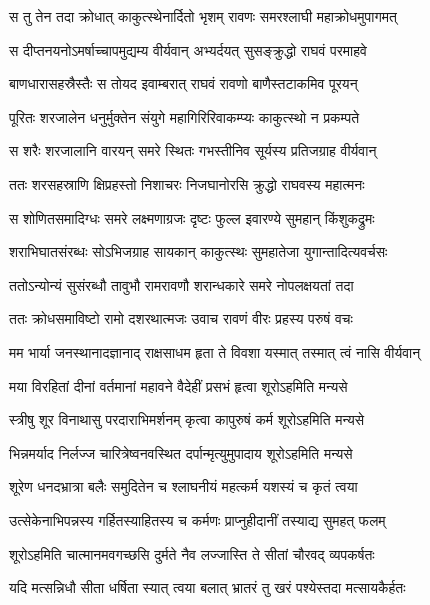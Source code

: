 
\twolineshloka
{स तु तेन तदा क्रोधात् काकुत्स्थेनार्दितो भृशम्}
{रावणः समरश्लाघी महाक्रोधमुपागमत्} %

\twolineshloka
{स दीप्तनयनोऽमर्षाच्चापमुद्यम्य वीर्यवान्}
{अभ्यर्दयत् सुसङ्क्रुद्धो राघवं परमाहवे} %

\twolineshloka
{बाणधारासहस्रैस्तैः स तोयद इवाम्बरात्}
{राघवं रावणो बाणैस्तटाकमिव पूरयन्} %

\twolineshloka
{पूरितः शरजालेन धनुर्मुक्तेन संयुगे}
{महागिरिरिवाकम्प्यः काकुत्स्थो न प्रकम्पते} %

\twolineshloka
{स शरैः शरजालानि वारयन् समरे स्थितः}
{गभस्तीनिव सूर्यस्य प्रतिजग्राह वीर्यवान्} %

\twolineshloka
{ततः शरसहस्राणि क्षिप्रहस्तो निशाचरः}
{निजघानोरसि क्रुद्धो राघवस्य महात्मनः} %

\twolineshloka
{स शोणितसमादिग्धः समरे लक्ष्मणाग्रजः}
{दृष्टः फुल्ल इवारण्ये सुमहान् किंशुकद्रुमः} %

\twolineshloka
{शराभिघातसंरब्धः सोऽभिजग्राह सायकान्}
{काकुत्स्थः सुमहातेजा युगान्तादित्यवर्चसः} %

\twolineshloka
{ततोऽन्योन्यं सुसंरब्धौ तावुभौ रामरावणौ}
{शरान्धकारे समरे नोपलक्षयतां तदा} %

\twolineshloka
{ततः क्रोधसमाविष्टो रामो दशरथात्मजः}
{उवाच रावणं वीरः प्रहस्य परुषं वचः} %

\twolineshloka
{मम भार्या जनस्थानादज्ञानाद् राक्षसाधम}
{हृता ते विवशा यस्मात् तस्मात् त्वं नासि वीर्यवान्} %

\twolineshloka
{मया विरहितां दीनां वर्तमानां महावने}
{वैदेहीं प्रसभं हृत्वा शूरोऽहमिति मन्यसे} %

\twolineshloka
{स्त्रीषु शूर विनाथासु परदाराभिमर्शनम्}
{कृत्वा कापुरुषं कर्म शूरोऽहमिति मन्यसे} %

\twolineshloka
{भिन्नमर्याद निर्लज्ज चारित्रेष्वनवस्थित}
{दर्पान्मृत्युमुपादाय शूरोऽहमिति मन्यसे} %

\twolineshloka
{शूरेण धनदभ्रात्रा बलैः समुदितेन च}
{श्लाघनीयं महत्कर्म यशस्यं च कृतं त्वया} %

\twolineshloka
{उत्सेकेनाभिपन्नस्य गर्हितस्याहितस्य च}
{कर्मणः प्राप्नुहीदानीं तस्याद्य सुमहत् फलम्} %

\twolineshloka
{शूरोऽहमिति चात्मानमवगच्छसि दुर्मते}
{नैव लज्जास्ति ते सीतां चौरवद् व्यपकर्षतः} %

\twolineshloka
{यदि मत्सन्निधौ सीता धर्षिता स्यात् त्वया बलात्}
{भ्रातरं तु खरं पश्येस्तदा मत्सायकैर्हतः} %

